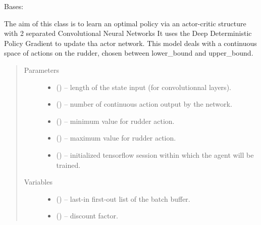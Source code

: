 \documentclass[letterpaper,10pt,english]{sphinxmanual}
\begin{document}
\begin{fulllineitems}
\label{\detokenize{package2:DDPG.DDPGAgent}}
Bases: 

The aim of this class is to learn an optimal policy via an actor-critic structure with 2 separated Convolutional Neural Networks
It uses the Deep Deterministic Policy Gradient to update tha actor network.
This model deals with a continuous space of actions on the rudder, chosen between lower\_bound and upper\_bound.
\begin{quote}\begin{description}
\item[{Parameters}] \leavevmode\begin{itemize}
\item {} 
 () -- length of the state input (for convolutionnal layers).

\item {} 
 () -- number of continuous action output by the network.

\item {} 
 () -- minimum value for rudder action.

\item {} 
 () -- maximum value for rudder action.

\item {} 
 () -- initialized tensorflow session within which the agent will be trained.

\end{itemize}

\item[{Variables}] \leavevmode\begin{itemize}
\item {} 
 () -- last-in first-out list of the batch buffer.

\item {} 
 () -- discount factor.


\end{itemize}
\end{description}
\end{quote}
\end{fulllineitems}
\end{document}
